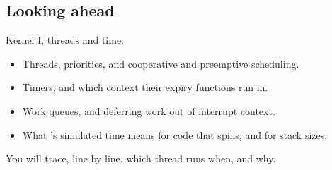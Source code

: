 \subsection*{Looking ahead}
Kernel I, threads and time:

\begin{itemize}
  \item Threads, priorities, and cooperative and preemptive scheduling.
  \item Timers, and which context their expiry functions run in.
  \item Work queues, and deferring work out of interrupt context.
  \item What ’s simulated time means for code that spins, and for stack sizes.
\end{itemize}

You will trace, line by line, which thread runs when, and why.
